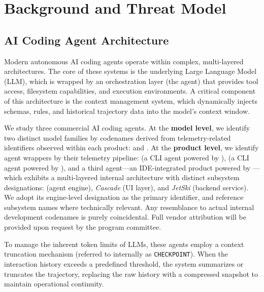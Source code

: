 
\section{Background and Threat Model}
\label{sec:background}

\subsection{AI Coding Agent Architecture}
Modern autonomous AI coding agents operate within complex, multi-layered architectures. The core of these systems is the underlying Large Language Model (LLM), which is wrapped by an orchestration layer (the agent) that provides tool access, filesystem capabilities, and execution environments. A critical component of this architecture is the context management system, which dynamically injects schemas, rules, and historical trajectory data into the model's context window.

We study three commercial AI coding agents. At the \textbf{model level}, we identify two distinct model families by codenames derived from telemetry-related identifiers observed within each product: \tengu{} and \confucius{}. At the \textbf{product level}, we identify agent wrappers by their telemetry pipeline: \statsig{} (a CLI agent powered by \tengu{}), \clearcut{} (a CLI agent powered by \confucius{}), and a third agent---an IDE-integrated product powered by \confucius{}---which exhibits a multi-layered internal architecture with distinct subsystem designations: \cortex{} (agent engine), \emph{Cascade} (UI layer), and \emph{JetSki} (backend service). We adopt its engine-level designation \cortex{} as the primary identifier, and reference subsystem names where technically relevant. Any resemblance to actual internal development codenames is purely coincidental. Full vendor attribution will be provided upon request by the program committee.

To manage the inherent token limits of LLMs, these agents employ a context truncation mechanism (referred to internally as \texttt{CHECKPOINT}). When the interaction history exceeds a predefined threshold, the system summarizes or truncates the trajectory, replacing the raw history with a compressed snapshot to maintain operational continuity.

